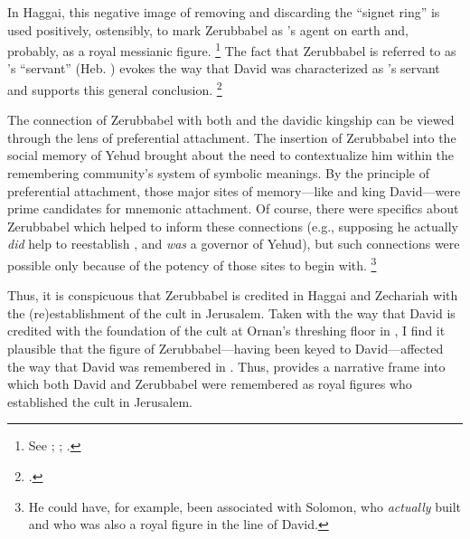 \noindent
In Haggai, this negative image of \yahweh removing and discarding the ``signet ring'' is used positively, ostensibly, to mark Zerubbabel as \yahweh's agent on earth and, probably, as a royal messianic figure.%
    \footnote{See
        \cite[71--103]{blenkinsopp2013};
        \cite[2:281--284]{vonrad1962};
        \cite[187]{redditt_interpretation2007}.}
The fact that Zerubbabel is referred to as \yahweh's ``servant'' (Heb. ) evokes the way that David was characterized as \yahweh's servant and supports this general conclusion.%
    \footnote{\Cite[80--81]{blenkinsopp2013}.}

The connection of Zerubbabel with both \thetemple and the davidic kingship can be viewed through the lens of preferential attachment. The insertion of Zerubbabel into the social memory of Yehud brought about the need to contextualize him within the remembering community's system of symbolic meanings. By the principle of preferential attachment, those major sites of memory---like \thetemple and king David---were prime candidates for mnemonic attachment. Of course, there were specifics about Zerubbabel which helped to inform these connections (e.g., supposing he actually \emph{did} help to reestablish \thetemple, and \emph{was} a governor of Yehud), but such connections were possible only because of the potency of those sites to begin with.%
    \footnote{He could have, for example, been associated with Solomon, who \emph{actually} built \thetemple and who was also a royal figure in the line of David.}

Thus, it is conspicuous that Zerubbabel is credited in Haggai and Zechariah with the (re)establishment of the cult in Jerusalem. Taken with the way that David is credited with the foundation of the cult at Ornan's threshing floor in \chronicles, I find it plausible that the figure of Zerubbabel---having been keyed to David---affected the way that David was remembered in \chronicles. Thus, \chronicles provides a narrative frame into which both David and Zerubbabel were remembered as royal figures who established the \yahwistic cult in Jerusalem. 

